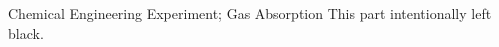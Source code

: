 \makecover

\begin{abstract}{化工原理实验; 气体吸收}
这一部分有意留白。
\end{abstract}


\begin{abstractEng}{Chemical Engineering Experiment; Gas Absorption}
This part intentionally left black.
\end{abstractEng}


\tableofcontents
